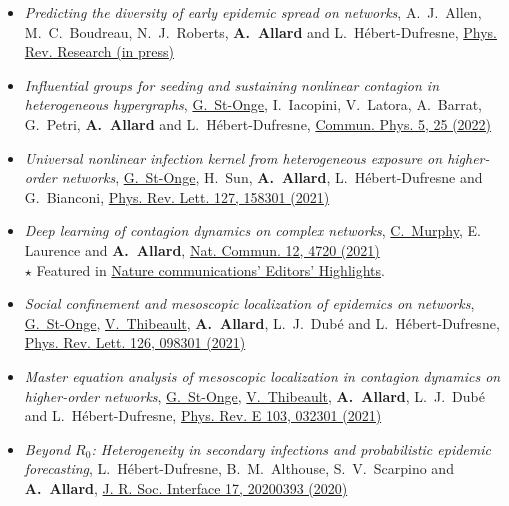 \documentclass[11pt]{article}
\begin{document}
\begin{itemize}
%
  \item \textit{Predicting the diversity of early epidemic spread on networks}, A.~J.~Allen, M.~C.~Boudreau, N.~J.~Roberts, \textbf{A.~Allard} and L.~H\'ebert-Dufresne, \href{https://arxiv.org/abs/2107.03334}{Phys. Rev. Research (in press)}
%
  \item \textit{Influential groups for seeding and sustaining nonlinear contagion in heterogeneous hypergraphs}, \uline{G.~St-Onge}, I.~Iacopini, V.~Latora, A.~Barrat, G.~Petri, \textbf{A.~Allard} and L.~H\'ebert-Dufresne, \href{https://doi.org/10.1038/s42005-021-00788-w}{Commun. Phys. 5, 25 (2022)}%
%
  \item \textit{Universal nonlinear infection kernel from heterogeneous exposure on higher-order networks}, \uline{G.~St-Onge}, H.~Sun, \textbf{A.~Allard}, L.~H\'ebert-Dufresne and G.~Bianconi, \href{https://doi.org/10.1103/PhysRevLett.127.158301}{Phys. Rev. Lett. 127, 158301 (2021)}%
%
  \item \textit{Deep learning of contagion dynamics on complex networks}, \uline{C.~Murphy}, E. Laurence and \textbf{A.~Allard}, \href{https://arxiv.org/abs/2006.05410}{Nat. Commun. 12, 4720 (2021)}\\%
  {\footnotesize $\star$ Featured in \href{https://www.nature.com/ncomms/editorshighlights}{Nature communications' Editors' Highlights}.}
%
  \item \textit{Social confinement and mesoscopic localization of epidemics on networks}, \uline{G.~St-Onge}, \uline{V.~Thibeault}, \textbf{A.~Allard}, L.~J.~Dub\'e and L.~H\'ebert-Dufresne, \href{http://doi.org/10.1103/PhysRevLett.126.098301}{Phys. Rev. Lett. 126, 098301 (2021)}%
%
  \item \textit{Master equation analysis of mesoscopic localization in contagion dynamics on higher-order networks}, \uline{G.~St-Onge}, \uline{V.~Thibeault}, \textbf{A.~Allard}, L.~J.~Dub\'e and L.~H\'ebert-Dufresne, \href{http://doi.org/10.1103/PhysRevE.103.032301}{Phys. Rev. E 103, 032301 (2021)}%
  \item \textit{Beyond $R_0$: Heterogeneity in secondary infections and probabilistic epidemic forecasting}, L.~H\'ebert-Dufresne, B.~M.~Althouse, S.~V.~Scarpino and \textbf{A.~Allard}, \href{https://doi.org/10.1098/rsif.2020.0393}{J. R. Soc. Interface 17, 20200393 (2020)}%

\end{itemize}
\end{document}

